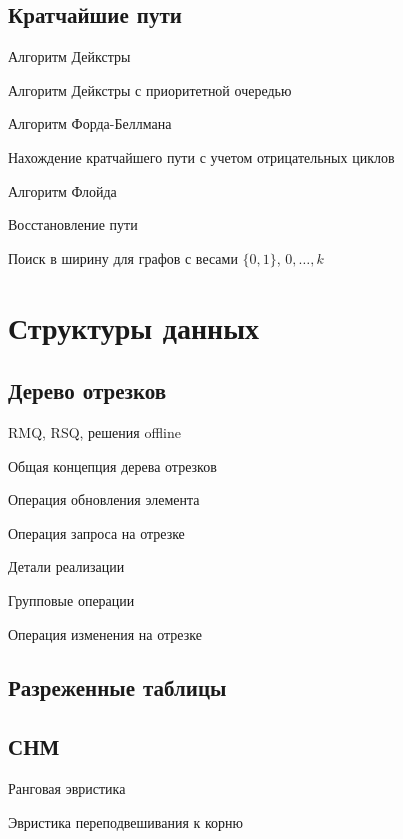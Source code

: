 \documentclass[a4paper,12pt]{article}
\begin{document}
\begin{multicols}{2}
    \subsection{Кратчайшие пути}
      \begin{compactenum}
        \item Алгоритм Дейкстры
        \item Алгоритм Дейкстры с приоритетной очередью
        \item Алгоритм Форда-Беллмана
        \item Нахождение кратчайшего пути с учетом отрицательных циклов
        \item Алгоритм Флойда
        \item Восстановление пути
        \item Поиск в ширину для графов с весами $\{0, 1\}$, ${0, \ldots, k}$
      \end{compactenum}

  \section{Структуры данных}

    \subsection{Дерево отрезков}
      \begin{compactenum}
        \item RMQ, RSQ, решения offline
        \item Общая концепция дерева отрезков
        \item Операция обновления элемента
        \item Операция запроса на отрезке
        \item Детали реализации
        \item Групповые операции
        \item Операция изменения на отрезке
      \end{compactenum}

    \subsection{Разреженные таблицы}

    \subsection{СНМ}
      \begin{compactenum}
        \item Ранговая эвристика
        \item Эвристика переподвешивания к корню
      \end{compactenum}


\end{multicols}
\end{document}
